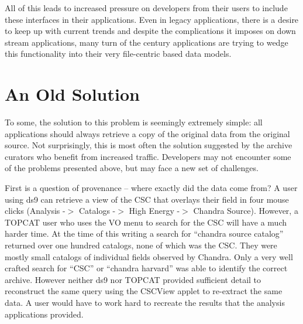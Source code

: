 All of this leads to increased pressure on developers  from their users to include these interfaces in their applications. Even in legacy applications, there is a desire to keep up with current trends and despite the complications it imposes on down stream applications, many turn of the century applications are trying to wedge this functionality into their very file-centric based data models.



\section{An Old Solution}

To some, the solution to this problem is seemingly extremely simple:  all applications should always retrieve a copy of the original data from the original source.  Not surprisingly, this is most often the solution suggested by the archive curators who benefit from increased traffic. Developers may not encounter some of the problems presented above, but may face a new set of challenges.


First is a question of provenance -- where exactly did the data come from? A user using ds9 can retrieve a view of the CSC that overlays their field in four mouse clicks  (Analysis -$>$ Catalogs -$>$ High Energy -$>$ Chandra Source). However, a TOPCAT user who uses the VO menu to search for the CSC will have a much harder time.  At the time of this writing a search for  ``chandra source catalog'' returned over one hundred catalogs, none of which was the CSC.  They were mostly small catalogs of individual fields observed by Chandra.  Only a very well crafted search for ``CSC'' or ``chandra harvard'' was able to identify the correct archive.  However neither ds9 nor TOPCAT provided sufficient detail to reconstruct the same query using the CSCView applet to re-extract the same data.  A user would have to work hard to recreate the results that the analysis applications provided.

